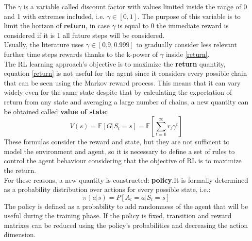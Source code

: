 The $\gamma$ is a variable called discount factor with values limited inside the range of 0 and 1 with extremes included, i.e. $\gamma \in [0,1]$. The purpose of this variable is to limit the horizon of \textbf{return}, in case $\gamma$ is equal to 0 the immediate reward is considered if it is 1 all future steps will be considered.\\
Usually, the literature uses $\gamma \in [0.9, 0.999]$ to gradually consider less relevant further time steps rewards thanks to the k-power of $\gamma$ inside \ref{return}.\\
The RL learning approach's objective is to maximize the \textbf{return} quantity, equation \ref{return} is not useful for the agent since it considers every possible chain that can be seen using the Markov reward process. This means that it can vary widely even for the same state despite that by calculating the expectation of return from any state and  averaging a large number of chains, a new quantity can be obtained called \textbf{value of state}:
\begin{equation}
	V(s) = \mathbb{E}[G | S_t = s] = \mathbb{E}[\sum_{t=0}^{\infty} r_t \gamma^t]
\end{equation}
These formulas consider the reward and state, but they are not sufficient to model the environment and agent, so it is necessary to define a set of rules to control the agent behaviour considering that the objective of RL is to maximize the return.\\
For these reasons, a new quantity is constructed: \textbf{policy}.It is formally determined as a probability distribution over actions for every possible state, i.e.:
\begin{equation}\label{policy}
	\pi(a|s) = P[A_t = a | S_t = s]
\end{equation}
The policy is defined as a probability to add randomness of the agent that will be useful during the training phase. If the policy is fixed, transition and reward matrixes can be reduced using the policy's probabilities and decreasing the action dimension.
